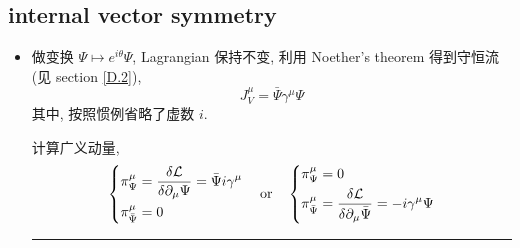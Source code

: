 \subsection{internal vector symmetry}
\begin{itemize}
	\item 做变换 $\Psi \mapsto e^{i \theta} \Psi$, Lagrangian 保持不变, 利用 Noether's theorem 得到守恒流 (见 section \ref{D.2}),
	\begin{equation} \label{7.3.3}
		J_V^\mu = \bar{\Psi} \gamma^\mu \Psi
	\end{equation}
	其中, 按照惯例省略了虚数 $i$.
	
	\begin{tcolorbox}[title=calculation:]
		计算广义动量,
		\begin{equation} \label{7.3.4}
			\begin{dcases}
				\pi_\Psi^\mu = \frac{\delta \mathcal{L}}{\delta \partial_\mu \Psi} = \bar{\Psi} i \gamma^\mu \\
				\pi_{\bar{\Psi}}^\mu = 0
			\end{dcases} \quad \text{or} \quad \begin{dcases}
				\pi_\Psi^\mu = 0 \\
				\pi_{\bar{\Psi}}^\mu = \frac{\delta \mathcal{L}}{\delta \partial_\mu \bar{\Psi}} = - i \gamma^\mu \Psi
			\end{dcases}
		\end{equation}
		
		\noindent\rule[0.5ex]{\linewidth}{0.5pt} %
		

\end{tcolorbox}
\end{itemize}
